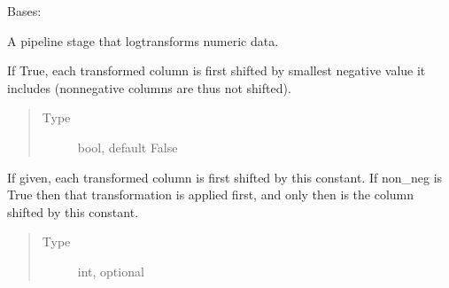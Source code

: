 \documentclass[letterpaper,10pt,english]{sphinxmanual}
\begin{document}

\begin{fulllineitems}
\label{\detokenize{dalio.pipe:dalio.pipe.col_generation.Log}}
Bases: {\hyperref[\detokenize{dalio.pipe:dalio.pipe.col_generation.Custom}]{}}

A pipeline stage that log\sphinxhyphen{}transforms numeric data.

\begin{fulllineitems}
\label{\detokenize{dalio.pipe:dalio.pipe.col_generation.Log.non_neg}}
If True, each transformed column is
first shifted by smallest negative value it includes
(non\sphinxhyphen{}negative columns are thus not shifted).
\begin{quote}\begin{description}
\item[{Type}] \leavevmode
bool, default False

\end{description}\end{quote}

\end{fulllineitems}


\begin{fulllineitems}
\label{\detokenize{dalio.pipe:dalio.pipe.col_generation.Log.const_shift}}
If given, each transformed column is
first shifted by this constant. If non\_neg is True then that
transformation is applied first, and only then is the column
shifted by this constant.
\begin{quote}\begin{description}
\item[{Type}] \leavevmode
int, optional


\end{description}
\end{quote}
\end{fulllineitems}
\end{fulllineitems}
\end{document}
